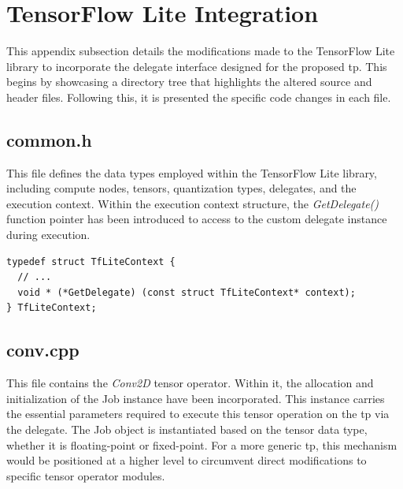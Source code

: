 \section{TensorFlow Lite Integration}
\label{chap:code_changes}
This appendix subsection details the modifications made to the TensorFlow Lite library to incorporate the delegate interface designed for the proposed \gls{tp}. This begins by showcasing a directory tree that highlights the altered source and header files. Following this, it is presented the specific code changes in each file.

\begin{figure}[!h]

\end{figure}
\FloatBarrier

\subsection*{common.h}

This file defines the data types employed within the TensorFlow Lite library, including compute nodes, tensors, quantization types, delegates, and the execution context. Within the execution context structure, the \textit{GetDelegate()} function pointer has been introduced to access to the custom delegate instance during execution.

\begin{verbatim}
typedef struct TfLiteContext {
  // ...
  void * (*GetDelegate) (const struct TfLiteContext* context);
} TfLiteContext;
\end{verbatim}

\subsection*{conv.cpp}
This file contains the \textit{Conv2D} tensor operator. Within it, the allocation and initialization of the Job instance have been incorporated. This instance carries the essential parameters required to execute this tensor operation on the \gls{tp} via the delegate. The Job object is instantiated based on the tensor data type, whether it is floating-point or fixed-point. For a more generic \gls{tp}, this mechanism would be positioned at a higher level to circumvent direct modifications to specific tensor operator modules.

